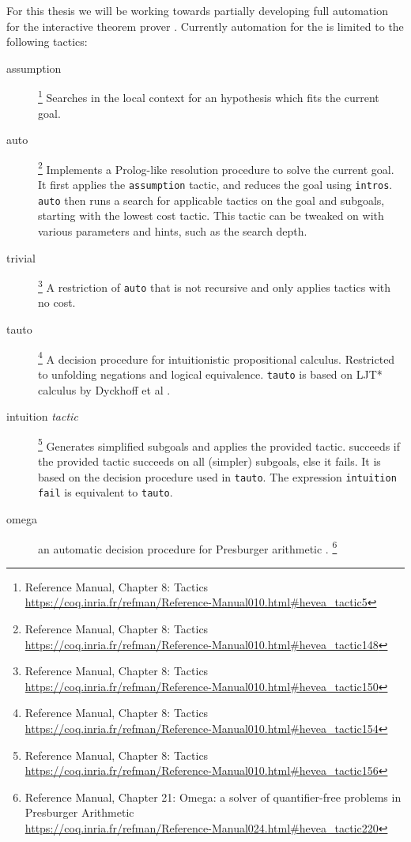 For this thesis we will be working towards partially developing full automation for the interactive theorem prover \coq.
Currently automation for the \coq is limited to the following tactics:
\begin{description}
\item[assumption]
  \footnote{
    \coq Reference Manual, Chapter 8:
    Tactics\\
    \url{https://coq.inria.fr/refman/Reference-Manual010.html\#hevea_tactic5}
  }
  Searches in the local context for an hypothesis which fits the current goal.
\item[auto]
  \footnote{
    \coq Reference Manual, Chapter 8:
    Tactics\\
    \url{https://coq.inria.fr/refman/Reference-Manual010.html\#hevea_tactic148}
  }
  Implements a Prolog-like resolution procedure to solve the current goal.
  It first applies the \texttt{assumption} tactic, and reduces the goal using \texttt{intros}.
  \texttt{auto} then runs a search for applicable tactics on the goal and subgoals, starting with the lowest cost tactic.
  This tactic can be tweaked on with various parameters and hints, such as the search depth.
\item[trivial]
  \footnote{
    \coq Reference Manual, Chapter 8:
    Tactics\\
    \url{https://coq.inria.fr/refman/Reference-Manual010.html\#hevea_tactic150}
  }
  A restriction of \texttt{auto} that is not recursive and only applies tactics with no cost.
\item[tauto]
  \footnote{
    \coq Reference Manual, Chapter 8:
    Tactics\\
    \url{https://coq.inria.fr/refman/Reference-Manual010.html\#hevea_tactic154}
  }
  A decision procedure for intuitionistic propositional calculus.
  Restricted to unfolding negations and logical equivalence.
  \texttt{tauto} is based on LJT* calculus by Dyckhoff et al \cite{dyckhoff1992contraction}.
\item[intuition \emph{tactic}]
  \footnote{
    \coq Reference Manual, Chapter 8:
    Tactics\\
    \url{https://coq.inria.fr/refman/Reference-Manual010.html\#hevea_tactic156}
  }
  Generates simplified subgoals and applies the provided tactic.
   succeeds if the provided tactic succeeds on all (simpler) subgoals, else it fails.
  It is based on the decision procedure used in \texttt{tauto}.
  The expression \texttt{intuition fail} is equivalent to \texttt{tauto}.
\item[omega]
  an automatic decision procedure for Presburger arithmetic \cite{stansifer1984presburger}.%
  \footnote{
    \coq Reference Manual, Chapter 21:
    Omega: a solver of quantifier-free problems in Presburger Arithmetic\\
    \url{https://coq.inria.fr/refman/Reference-Manual024.html\#hevea_tactic220}
  }
\end{description}

